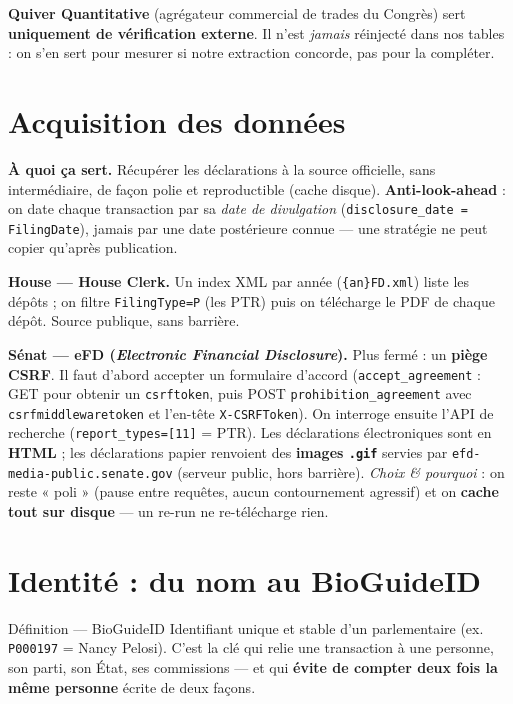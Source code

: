 \documentclass[11pt,a4paper]{article}
\newcommand{\code}[1]{\texttt{\small #1}}
\begin{document}
\textbf{Quiver Quantitative} (agrégateur commercial de trades du Congrès) sert \textbf{uniquement de
vérification externe}. Il n'est \emph{jamais} réinjecté dans nos tables : on s'en sert pour mesurer si
notre extraction concorde, pas pour la compléter.

\section{Acquisition des données}

\textbf{À quoi ça sert.} Récupérer les déclarations à la source officielle, sans intermédiaire, de façon
polie et reproductible (cache disque). \textbf{Anti-look-ahead} : on date chaque transaction par sa
\emph{date de divulgation} (\code{disclosure\_date = FilingDate}), jamais par une date postérieure
connue --- une stratégie ne peut copier qu'après publication.

\textbf{House --- House Clerk.} Un index XML par année (\code{\{an\}FD.xml}) liste les dépôts ; on
filtre \code{FilingType=P} (les PTR) puis on télécharge le PDF de chaque dépôt. Source publique, sans
barrière.

\textbf{Sénat --- eFD (\emph{Electronic Financial Disclosure}).} Plus fermé : un \textbf{piège CSRF}.
Il faut d'abord accepter un formulaire d'accord (\code{accept\_agreement} : GET pour obtenir un
\code{csrftoken}, puis POST \code{prohibition\_agreement} avec \code{csrfmiddlewaretoken} et l'en-tête
\code{X-CSRFToken}). On interroge ensuite l'API de recherche (\code{report\_types=[11]} = PTR). Les
déclarations électroniques sont en \textbf{HTML} ; les déclarations papier renvoient des \textbf{images
\code{.gif}} servies par \code{efd-media-public.senate.gov} (serveur public, hors barrière). \emph{Choix
\& pourquoi} : on reste « poli » (pause entre requêtes, aucun contournement agressif) et on \textbf{cache
tout sur disque} --- un re-run ne re-télécharge rien.

\section{Identité : du nom au BioGuideID}

\begin{defbox}{Définition --- BioGuideID}
Identifiant unique et stable d'un parlementaire (ex. \code{P000197} = Nancy Pelosi). C'est la clé qui
relie une transaction à une personne, son parti, son État, ses commissions --- et qui \textbf{évite de
compter deux fois la même personne} écrite de deux façons.
\end{defbox}
\end{document}

